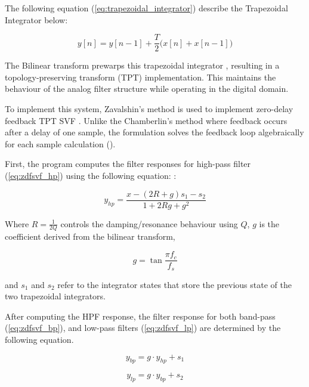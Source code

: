 The following equation (\ref{eq:trapezoidal_integrator}) describe the Trapezoidal Integrator below:

\begin{equation}\label{eq:trapezoidal_integrator}
y\left[n\right] = y \left[n-1\right]+\frac{T}{2}\bigl(x\left[n\right]+x\left[n-1\right]\bigr)
\end{equation}

The Bilinear transform prewarps this trapezoidal integrator \cite{vafilterdesign2021}, resulting in a 
topology-preserving transform (TPT) implementation. This maintains the behaviour of the analog filter structure
while operating in the digital domain.

To implement this system, Zavalshin's method is used to implement zero-delay feedback TPT SVF \cite{vafilterdesign2021,synthengineer_zdf_filters}. 
Unlike the Chamberlin's method where feedback occurs after a delay of one sample, the formulation solves the feedback loop algebraically for
each sample calculation ().

First, the program computes the filter responses for high-pass filter (\ref{eq:zdfsvf_hp}) using the following equation: 
 \cite{vafilterdesign2021}:

\begin{equation}\label{eq:zdfsvf_hp}
    y_{hp} = \frac{x - (2R + g)s_1 - s_2}{1 + 2Rg + g^2}
\end{equation}

Where $R = \frac{1}{2Q}$ controls the damping/resonance behaviour using $Q$, $g$ is the coefficient derived from the bilinear transform,

\begin{equation}\label{eq:zdfsvf_g}
    g = \tan{\frac{\pi f_c}{f_s}}
\end{equation}

and $s_1$ and $s_2$ refer to the integrator states that store the previous state of 
the two trapezoidal integrators.

After computing the HPF response, the filter response for both band-pass
(\ref{eq:zdfsvf_bp}), and low-pass filters (\ref{eq:zdfsvf_lp}) are determined by the following equation.

\begin{equation}\label{eq:zdfsvf_bp}
    y_{bp} = g \cdot y_{hp} + s_1
\end{equation}

\begin{equation}\label{eq:zdfsvf_lp}
    y_{lp} = g \cdot y_{bp} + s_2
\end{equation}

